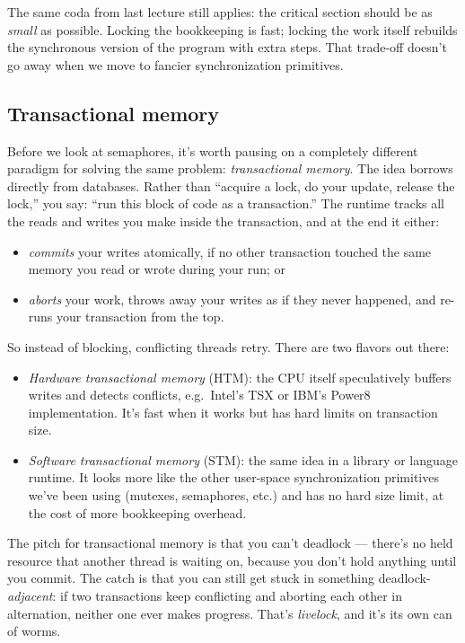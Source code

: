 \documentclass[11pt]{article}
\begin{document}
The same coda from last lecture still applies: the critical section
should be as \emph{small} as possible. Locking the bookkeeping is
fast; locking the work itself rebuilds the synchronous version of the
program with extra steps. That trade-off doesn't go away when we move
to fancier synchronization primitives.

\subsection*{Transactional memory}

Before we look at semaphores, it's worth pausing on a completely
different paradigm for solving the same problem: \emph{transactional
memory}. The idea borrows directly from databases. Rather than
``acquire a lock, do your update, release the lock,'' you say: ``run
this block of code as a transaction.'' The runtime tracks all the
reads and writes you make inside the transaction, and at the end it
either:
\begin{itemize}
  \item \emph{commits} your writes atomically, if no other transaction
    touched the same memory you read or wrote during your run; or
  \item \emph{aborts} your work, throws away your writes as if they
    never happened, and re-runs your transaction from the top.
\end{itemize}

So instead of blocking, conflicting threads retry. There are two
flavors out there:
\begin{itemize}
  \item \emph{Hardware transactional memory} (HTM): the CPU itself
    speculatively buffers writes and detects conflicts, e.g.\ Intel's
    TSX or IBM's Power8 implementation. It's fast when it works but
    has hard limits on transaction size.
  \item \emph{Software transactional memory} (STM): the same idea in
    a library or language runtime. It looks more like the other
    user-space synchronization primitives we've been using
    (mutexes, semaphores, etc.) and has no hard size limit, at the
    cost of more bookkeeping overhead.
\end{itemize}

The pitch for transactional memory is that you can't deadlock --- there's
no held resource that another thread is waiting on, because you don't
hold anything until you commit. The catch is that you can still get
stuck in something deadlock-\emph{adjacent}: if two transactions keep
conflicting and aborting each other in alternation, neither one ever
makes progress. That's \emph{livelock}, and it's its own can of worms.
\end{document}
